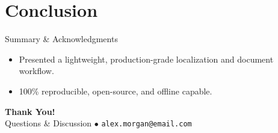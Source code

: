 \documentclass[aspectratio=169,10pt]{beamer}
\begin{document}
\section{Conclusion}
\begin{frame}{Summary \& Acknowledgments}
    \begin{itemize}
        \item Presented a lightweight, production-grade localization and document workflow.
        \item 100\% reproducible, open-source, and offline capable.
    \end{itemize}
    \vspace{0.6cm}
    \centering
    \textbf{\huge Thank You!}\\[0.3cm]
    \normalsize Questions \& Discussion \quad $\bullet$ \quad \texttt{alex.morgan@email.com}
\end{frame}
\end{document}

